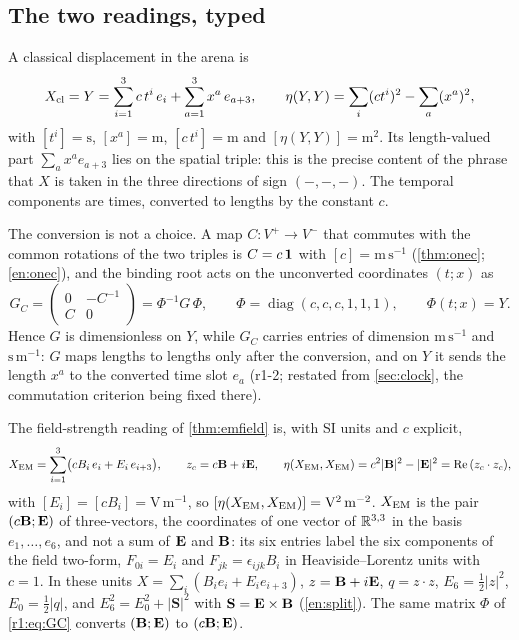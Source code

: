 \subsection{The two readings, typed}
\label{r1:sec:types}

\begin{definition}
\label{r1:def:cl}
A classical displacement in the arena is
\begin{equation}
\label{r1:eq:Y}
X_{\rm cl}=Y=\sum_{i=1}^3c\,t^i\,e_i+\sum_{a=1}^3x^a\,e_{a+3},\qquad \eta(Y,Y)=\sum_i(ct^i)^2-\sum_a(x^a)^2,
\end{equation}
with $[t^i]=\mathrm s$, $[x^a]=\mathrm m$, $[c\,t^i]=\mathrm m$ and $[\eta(Y,Y)]=\mathrm m^2$. Its length-valued part $\sum_ax^ae_{a+3}$ lies on the spatial triple: this is the precise content of the phrase that $X$ is taken in the
three directions of sign $(-,-,-)$. The temporal components are times, converted to lengths by the constant $c$.
\end{definition}

The conversion is not a choice. A map $C:V^+\to V^-$ that commutes with the common rotations of the two triples is $C=c\,\mathbf 1$ with
$[c]=\mathrm{m\,s^{-1}}$ (\cref{thm:onec}; \cref{en:onec}), and the binding root acts on the unconverted
coordinates $(t;x)$ as
\begin{equation}
\label{r1:eq:GC}
G_C=\begin{pmatrix}0&-C^{-1}\\ C&0\end{pmatrix}=\Phi^{-1}G\,\Phi,\qquad \Phi=\operatorname{diag}(c,c,c,1,1,1),\qquad \Phi(t;x)=Y .
\end{equation}
Hence $G$ is dimensionless on $Y$, while $G_C$ carries entries of dimension $\mathrm{m\,s^{-1}}$ and $\mathrm{s\,m^{-1}}$: $G$ maps
lengths to lengths only after the conversion, and on $Y$ it sends the length $x^a$ to the converted time slot $e_a$ (r1-2; restated from \cref{sec:clock}, the commutation criterion being fixed there).

\begin{definition}
\label{r1:def:em}
The field-strength reading of \cref{thm:emfield} is, with SI units and $c$ explicit,
\begin{equation}
\label{r1:eq:XEM}
X_{\rm EM}=\sum_{i=1}^3\bigl(cB_i\,e_i+E_i\,e_{i+3}\bigr),\qquad z_c=c\mathbf B+i\mathbf E,\qquad
\eta(X_{\rm EM},X_{\rm EM})=c^2|\mathbf B|^2-|\mathbf E|^2=\operatorname{Re}\,(z_c\cdot z_c),
\end{equation}
with $[E_i]=[cB_i]=\mathrm{V\,m^{-1}}$, so $[\eta(X_{\rm EM},X_{\rm EM})]=\mathrm{V^2\,m^{-2}}$. $X_{\rm EM}$ is the pair $(c\mathbf B;\mathbf E)$ of
three-vectors, the coordinates of one vector of $\mathbb{R}^{3,3}$ in the basis $e_1,\dots,e_6$, and not a sum of $\mathbf E$ and $\mathbf B$: its six
entries label the six components of the field two-form, $F_{0i}=E_i$ and $F_{jk}=\epsilon_{ijk}B_i$ in Heaviside--Lorentz units with
$c=1$. In these units $X=\sum_i(B_ie_i+E_ie_{i+3})$,
$z=\mathbf B+i\mathbf E$, $q=z\cdot z$, $E_6=\tfrac12|z|^2$, $E_0=\tfrac12|q|$, and $E_6^2=E_0^2+|\mathbf S|^2$ with $\mathbf S=\mathbf E\times\mathbf B$
(\cref{en:split}). The same matrix $\Phi$ of \eqref{r1:eq:GC} converts $(\mathbf B;\mathbf E)$ to $(c\mathbf B;\mathbf E)$.
\end{definition}

